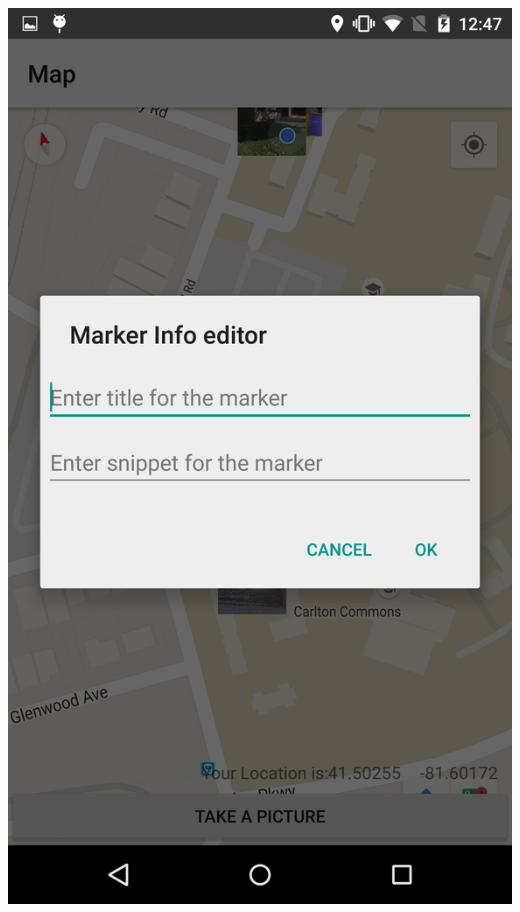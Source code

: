 \documentclass[]{article}
\begin{document}
\includegraphics[keepaspectratio, width=\textwidth]{mapMarker1}
\end{document}
